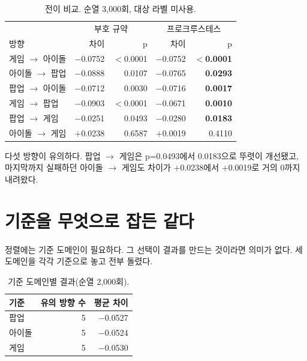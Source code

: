 \documentclass[10pt]{article}
\begin{document}
\begin{table}[t]
\centering\tsize
\caption{전이 비교. 순열 3,000회, 대상 라벨 미사용.}
\begin{tabular}{lrrrr}
\toprule
& \multicolumn{2}{c}{부호 규약} & \multicolumn{2}{c}{프로크루스테스} \\
방향 & 차이 & p & 차이 & p \\
\midrule
게임 $\to$ 아이돌 & $-$0.0752 & $<$0.0001 & $-$0.0752 & \textbf{$<$0.0001} \\
아이돌 $\to$ 팝업 & $-$0.0888 & 0.0107 & $-$0.0765 & \textbf{0.0293} \\
팝업 $\to$ 아이돌 & $-$0.0712 & 0.0030 & $-$0.0716 & \textbf{0.0017} \\
게임 $\to$ 팝업 & $-$0.0903 & $<$0.0001 & $-$0.0671 & \textbf{0.0010} \\
팝업 $\to$ 게임 & $-$0.0251 & 0.0493 & $-$0.0280 & \textbf{0.0183} \\
\midrule
아이돌 $\to$ 게임 & $+$0.0238 & 0.6587 & $+$0.0019 & 0.4110 \\
\bottomrule
\end{tabular}
\end{table}

다섯 방향이 유의하다. 팝업 $\to$ 게임은 p=0.0493에서 0.0183으로 뚜렷이 개선됐고,
마지막까지 실패하던 아이돌 $\to$ 게임도 차이가 $+$0.0238에서 $+$0.0019로 거의
0까지 내려왔다.


\section{기준을 무엇으로 잡든 같다}

정렬에는 기준 도메인이 필요하다. 그 선택이 결과를 만드는 것이라면 의미가 없다.
세 도메인을 각각 기준으로 놓고 전부 돌렸다.

\begin{table}[t]
\centering\tsize
\caption{기준 도메인별 결과(순열 2,000회).}
\begin{tabular}{lrr}
\toprule
기준 & 유의 방향 수 & 평균 차이 \\
\midrule
팝업   & 5 & $-$0.0527 \\
아이돌 & 5 & $-$0.0524 \\
게임   & 5 & $-$0.0530 \\
\bottomrule
\end{tabular}
\end{table}
\end{document}
